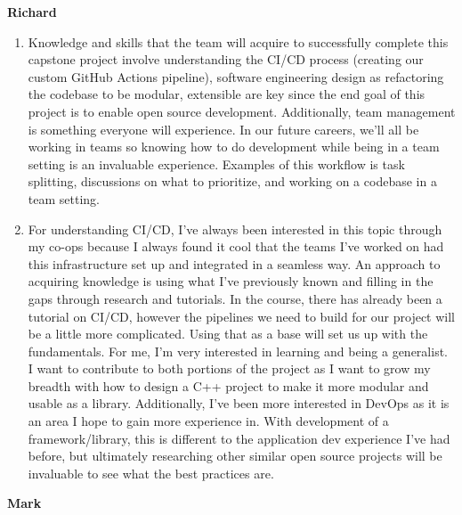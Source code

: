 \documentclass[12pt]{article}
\begin{document}
\textbf{Richard}

\begin{enumerate}

  \item Knowledge and skills that the team will acquire to successfully complete this capstone project involve understanding the CI/CD process (creating our custom GitHub Actions pipeline), software engineering design as refactoring the codebase to be modular, extensible are key since the end goal of this project is to enable open source development. Additionally, team management is something everyone will experience. In our future careers, we’ll all be working in teams so knowing how to do development while being in a team setting is an invaluable experience. Examples of this workflow is task splitting, discussions on what to prioritize, and working on a codebase in a team setting.

  
  \item For understanding CI/CD, I’ve always been interested in this topic through my co-ops because I always found it cool that the teams I’ve worked on had this infrastructure set up and integrated in a seamless way. An approach to acquiring knowledge is using what I’ve previously known and filling in the gaps through research and tutorials. In the course, there has already been a tutorial on CI/CD, however the pipelines we need to build for our project will be a little more complicated. Using that as a base will set us up with the fundamentals. For me, I’m very interested in learning and being a generalist. I want to contribute to both portions of the project as I want to grow my breadth with how to design a C++ project to make it more modular and usable as a library. Additionally, I’ve been more interested in DevOps as it is an area I hope to gain more experience in. With development of a framework/library, this is different to the application dev experience I’ve had before, but ultimately researching other similar open source projects will be invaluable to see what the best practices are.
  
  \end{enumerate}


\textbf{Mark}
\end{document}
